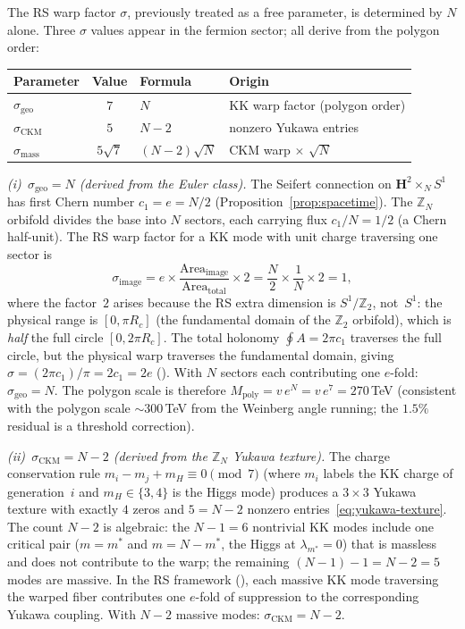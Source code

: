 The RS warp factor $\sigma$, previously treated as a free parameter,
is determined by $N$ alone.
Three $\sigma$ values appear in the fermion sector;
all derive from the polygon order:
\begin{center}\small
\begin{tabular}{lcll}
\toprule
Parameter & Value & Formula & Origin \\
\midrule
$\sigma_{\mathrm{geo}}$ & $7$ & $N$ & KK warp factor (polygon order) \\
$\sigma_{\mathrm{CKM}}$ & $5$ & $N{-}2$ & nonzero Yukawa entries \\
$\sigma_{\mathrm{mass}}$ & $5\sqrt{7}$ & $(N{-}2)\sqrt{N}$ & CKM warp $\times$ $\sqrt{N}$ \\
\bottomrule
\end{tabular}
\end{center}
\noindent
\emph{(i)~$\sigma_{\mathrm{geo}} = N$ (derived from the Euler class).}
The Seifert connection on $\mathbf{H}^2 \times_N S^1$
has first Chern number $c_1 = e = N/2$
(Proposition~\ref{prop:spacetime}).
The $\mathbb{Z}_N$ orbifold divides the base into $N$ sectors,
each carrying flux $c_1/N = 1/2$ (a Chern half-unit).
The RS warp factor for a KK mode with unit charge
traversing one sector is
\[
  \sigma_{\mathrm{image}}
  = e \times \frac{\mathrm{Area}_{\mathrm{image}}}
  {\mathrm{Area}_{\mathrm{total}}} \times 2
  = \frac{N}{2} \times \frac{1}{N} \times 2 = 1,
\]
where the factor~$2$ arises because the RS extra dimension
is $S^1/\mathbb{Z}_2$, not~$S^1$: the physical range is
$[0, \pi R_c]$ (the fundamental domain of the
$\mathbb{Z}_2$ orbifold), which is \emph{half} the full
circle $[0, 2\pi R_c]$.
The total holonomy $\oint A = 2\pi c_1$ traverses the
full circle, but the physical warp traverses the
fundamental domain, giving
$\sigma = (2\pi c_1)/\pi = 2c_1 = 2e$
(\citealt{RandallSundrum1999}).
With $N$ sectors each contributing one $e$-fold:
$\sigma_{\mathrm{geo}} = N$.
The polygon scale is therefore
$M_{\mathrm{poly}} = v\,e^N = v\,e^7 = 270$\,TeV
(consistent with the polygon scale
${\sim}300$\,TeV from the Weinberg angle running;
the $1.5\%$ residual is a threshold correction).

\emph{(ii)~$\sigma_{\mathrm{CKM}} = N - 2$
(derived from the $\mathbb{Z}_N$ Yukawa texture).}
The charge conservation rule
$m_i - m_j + m_H \equiv 0 \pmod{7}$
(where $m_i$ labels the KK charge of generation~$i$
and $m_H \in \{3, 4\}$ is the Higgs mode)
produces a $3 \times 3$ Yukawa texture with exactly $4$ zeros
and $5 = N{-}2$ nonzero entries~\eqref{eq:yukawa-texture}.
The count $N{-}2$ is algebraic: the $N{-}1 = 6$ nontrivial
KK modes include one critical pair ($m = m^*$ and $m = N{-}m^*$,
the Higgs at $\lambda_{m^*} = 0$) that is massless and does not
contribute to the warp; the remaining
$(N{-}1) - 1 = N{-}2 = 5$ modes are massive.
In the RS framework (\citealt{RandallSundrum1999}),
each massive KK mode traversing the warped fiber
contributes one $e$-fold of suppression to the
corresponding Yukawa coupling.
With $N{-}2$ massive modes: $\sigma_{\mathrm{CKM}} = N{-}2$.

